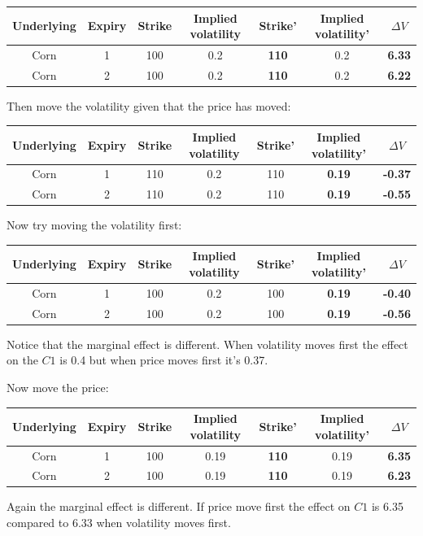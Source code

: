 \begin{tabular}{|c|c|c|c|c|c|c|}
\hline
Underlying & Expiry & Strike & Implied volatility & Strike' & Implied volatility' & $\Delta V$\\ 
\hline
Corn & 1 & 100 & 0.2 & \textbf{110} & 0.2 & \textbf{6.33} \\
Corn & 2 & 100 & 0.2& \textbf{110} & 0.2 & \textbf{6.22} \\
\hline
\end{tabular}

Then move the volatility given that the price has moved:

\begin{tabular}{|c|c|c|c|c|c|c|}
\hline
Underlying & Expiry & Strike & Implied volatility & Strike' & Implied volatility' & $\Delta V$\\ 
\hline
Corn & 1 & 110 & 0.2 & 110 & \textbf{0.19} & \textbf{-0.37} \\
Corn & 2 & 110 & 0.2& 110 & \textbf{0.19} & \textbf{-0.55} \\
\hline
\end{tabular}

Now try moving the volatility first:

\begin{tabular}{|c|c|c|c|c|c|c|}
\hline
Underlying & Expiry & Strike & Implied volatility & Strike' & Implied volatility' & $\Delta V$\\ 
\hline
Corn & 1 & 100 & 0.2 & 100 & \textbf{0.19} & \textbf{-0.40} \\
Corn & 2 & 100 & 0.2& 100 & \textbf{0.19} & \textbf{-0.56} \\
\hline
\end{tabular}

Notice that the marginal effect is different. When volatility moves first the effect on the $C1$ is 0.4 but when price moves first it's 0.37. 

Now move the price:

\begin{tabular}{|c|c|c|c|c|c|c|}
\hline
Underlying & Expiry & Strike & Implied volatility & Strike' & Implied volatility' & $\Delta V$\\ 
\hline
Corn & 1 & 100 & 0.19 & \textbf{110} & 0.19 & \textbf{6.35} \\
Corn & 2 & 100 & 0.19& \textbf{110} & 0.19 & \textbf{6.23} \\
\hline
\end{tabular}

Again the marginal effect is different. If price move first the effect on $C1$ is 6.35 compared to 6.33 when volatility moves first. 

